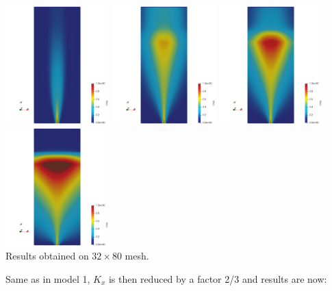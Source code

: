 \begin{center}
\includegraphics[width=4cm]{python_codes/fieldstone_126/results/model3/nelx32/Ovp_1.png}
\includegraphics[width=4cm]{python_codes/fieldstone_126/results/model3/nelx32/Ovp_2.png}
\includegraphics[width=4cm]{python_codes/fieldstone_126/results/model3/nelx32/Ovp_3.png}
\includegraphics[width=4cm]{python_codes/fieldstone_126/results/model3/nelx32/Ovp_4.png}\\
{\captionfont Results obtained on $32\times 80$ mesh.}
\end{center}

Same as in model 1, $K_x$ is then reduced by a factor 2/3 and results are now:


